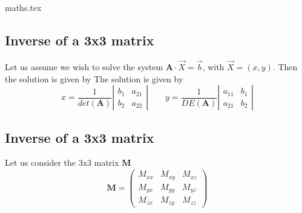 \begin{flushright} {\tiny {\color{gray} maths.tex}} \end{flushright}

\subsection{Inverse of a 3x3 matrix \label{sec:inv2x2}}

Let us assume we wish to solve the 
system $\bm A \cdot \vec X = \vec b$, with $\vec X=(x,y)$. Then the solution is given by
The solution is given by
\[
x=\frac{1}{det(\bm A)}
\left|
\begin{array}{cc}
b_1 & a_{21} \\
b_2 & a_{22}
\end{array}
\right|
\qquad
y=\frac{1}{DE(\bm A)}
\left|
\begin{array}{cc}
a_{11} & b_1\\
a_{21} & b_2
\end{array}
\right|
\]



\subsection{Inverse of a 3x3 matrix \label{sec:inv3x3}}

Let us consider the 3x3 matrix ${\bm M}$
\[
{\bm M}=
\left(
\begin{array}{ccc}
M_{xx} & M_{xy} & M_{xz} \\
M_{yx} & M_{yy} & M_{yz} \\
M_{zx} & M_{zy} & M_{zz} 
\end{array}
\right)
\]


